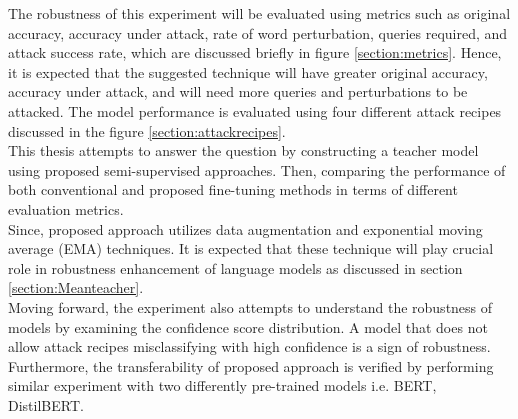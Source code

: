 \documentclass[%
	BCOR=8mm, %
	DIV=12,
	toc=bibliography, %
	toc=listof, %
	oneside, %
	egregdoesnotlikesansseriftitles, %
	]{scrbook}
\begin{document}
The robustness of this experiment will be evaluated using metrics such as original accuracy, accuracy under attack, rate of word perturbation, queries required, and attack success rate, which are discussed briefly in figure \ref{section:metrics}. Hence, it is expected that the suggested technique will have greater original accuracy, accuracy under attack, and will need more queries and perturbations to be attacked. The model performance is evaluated using four different attack recipes discussed in the figure \ref{section:attackrecipes}.\\
This thesis attempts to answer the question by constructing a teacher model using proposed semi-supervised approaches. Then, comparing the performance of both conventional and proposed fine-tuning methods in terms of different evaluation metrics. \\
Since, proposed approach utilizes data augmentation and exponential moving average (EMA) techniques. It is expected that these technique will play crucial role in robustness enhancement of language models as discussed in section \ref{section:Meanteacher}.\\
Moving forward, the experiment also attempts to understand the robustness of models by examining the confidence score distribution. A model that does not allow attack recipes misclassifying with high confidence is a sign of robustness. Furthermore, the transferability of proposed approach is verified by performing similar experiment with two differently pre-trained models i.e. BERT, DistilBERT.
\end{document}
